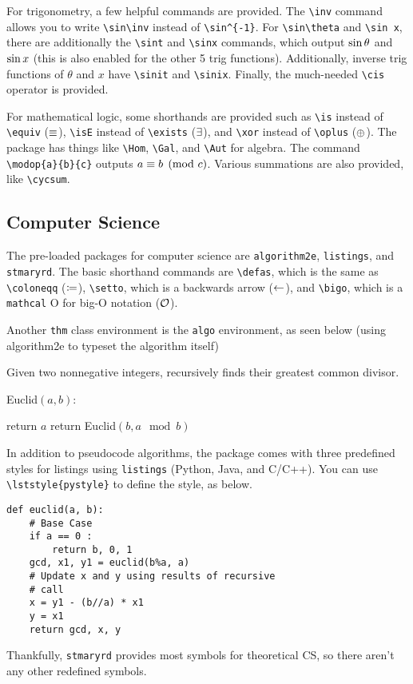 \documentclass[11pt]{article}
\begin{document}
For trigonometry, a few helpful commands are provided. The \verb|\inv| command allows you to write \verb|\sin\inv| instead of \verb|\sin^{-1}|. For \verb|\sin\theta| and \verb|\sin x|, there are additionally the \verb|\sint| and \verb|\sinx| commands, which output $\sin\theta$ and $\sin x$ (this is also enabled for the other 5 trig functions). Additionally, inverse trig functions of $\theta$ and $x$ have \verb|\sinit| and \verb|\sinix|. Finally, the much-needed \verb|\cis| operator is provided.

For mathematical logic, some shorthands are provided such as \verb|\is| instead of \verb|\equiv| ($\equiv$), \verb|\isE| instead of \verb|\exists| ($\mathord{\exists}$), and \verb|\xor| instead of \verb|\oplus| ($\oplus$). The package has things like \verb|\Hom|, \verb|\Gal|, and \verb|\Aut| for algebra. The command \verb|\modop{a}{b}{c}| outputs $a \equiv b \pmod{c}$. Various summations are also provided, like \verb|\cycsum|.

\subsection{Computer Science}
The pre-loaded packages for computer science are \texttt{algorithm2e}, \texttt{listings}, and \texttt{stmaryrd}. The basic shorthand commands are \verb|\defas|, which is the same as \verb|\coloneqq| ($\coloneqq$), \verb|\setto|, which is a backwards arrow ($\leftarrow$), and \verb|\bigo|, which is a \texttt{mathcal} O for big-O notation ($\mathcal{O}$).

Another \texttt{thm} class environment is the \texttt{algo} environment, as seen below (using algorithm2e to typeset the algorithm itself)
\begin{algo}
	Given two nonnegative integers, recursively finds their greatest common divisor.
	\begin{algorithm}[H]
    	Euclid$(a,b)$:
    	
      	{
        	return $a$
      	}
      	{
        	return Euclid$(b,a\mod b)$
      	}	
	\end{algorithm}
\end{algo}
In addition to pseudocode algorithms, the package comes with three predefined styles for listings using \texttt{listings} (Python, Java, and C/C++). You can use \verb|\lststyle{pystyle}| to define the style, as below.

\begin{lstlisting}[caption=Extended Euclidean Algorithm in Python]
def euclid(a, b):  
    # Base Case  
    if a == 0 :   
        return b, 0, 1
    gcd, x1, y1 = euclid(b%a, a)
    # Update x and y using results of recursive  
    # call  
    x = y1 - (b//a) * x1  
    y = x1  
    return gcd, x, y 
\end{lstlisting}
Thankfully, \texttt{stmaryrd} provides most symbols for theoretical CS, so there aren't any other redefined symbols.
\end{document}
